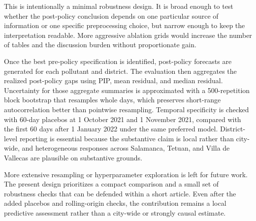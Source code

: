 This is intentionally a minimal robustness design. It is broad enough to test whether the post-policy conclusion depends on one particular source of information or one specific preprocessing choice, but narrow enough to keep the interpretation readable. More aggressive ablation grids would increase the number of tables and the discussion burden without proportionate gain.

Once the best pre-policy specification is identified, post-policy forecasts are generated for each pollutant and district. The evaluation then aggregates the realized post-policy gaps using PIP, mean residual, and median residual. Uncertainty for those aggregate summaries is approximated with a 500-repetition block bootstrap that resamples whole days, which preserves short-range autocorrelation better than pointwise resampling. Temporal specificity is checked with 60-day placebos at 1 October 2021 and 1 November 2021, compared with the first 60 days after 1 January 2022 under the same preferred model. District-level reporting is essential because the substantive claim is local rather than city-wide, and heterogeneous responses across Salamanca, Tetuan, and Villa de Vallecas are plausible on substantive grounds.

More extensive resampling or hyperparameter exploration is left for future work. The present design prioritizes a compact comparison and a small set of robustness checks that can be defended within a short article. Even after the added placebos and rolling-origin checks, the contribution remains a local predictive assessment rather than a city-wide or strongly causal estimate.
